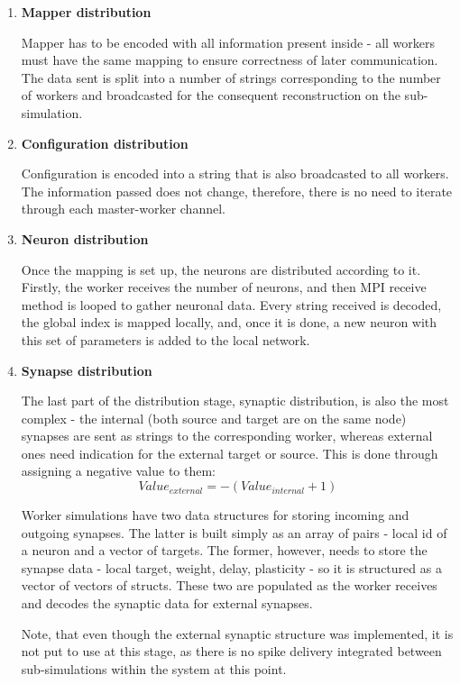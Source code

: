 \begin{enumerate}
\item{\textbf{Mapper distribution}}

Mapper has to be encoded with all information present inside - all workers must have the same mapping to ensure correctness of later communication. The data sent is split into a number of strings corresponding to the number of workers and broadcasted for the consequent reconstruction on the sub-simulation.

\item{\textbf{Configuration distribution}}

Configuration is encoded into a string that is also broadcasted to all workers. The information passed does not change, therefore, there is no need to iterate through each master-worker channel.

\item{\textbf{Neuron distribution}}

Once the mapping is set up, the neurons are distributed according to it. Firstly, the worker receives the number of neurons, and then MPI receive method is looped to gather neuronal data. Every string received is decoded, the global index is mapped locally, and, once it is done, a new neuron with this set of parameters is added to the local network.

\item{\textbf{Synapse distribution}}

The last part of the distribution stage, synaptic distribution, is also the most complex - the internal (both source and target are on the same node) synapses are sent as strings to the corresponding worker, whereas external ones need indication for the external target or source. This is done through assigning a negative value to them:
\begin{equation}Value_{external} = -(Value_{internal}+1)\end{equation}

Worker simulations have two data structures for storing incoming and outgoing synapses. The latter is built simply as an array of pairs - local id of a neuron and a vector of targets. The former, however, needs to store the synapse data - local target, weight, delay, plasticity - so it is structured as a vector of vectors of structs. These two are populated as the worker receives and decodes the synaptic data for external synapses.

Note, that even though the external synaptic structure was implemented, it is not put to use at this stage, as there is no spike delivery integrated between sub-simulations within the system at this point.
\end{enumerate}

